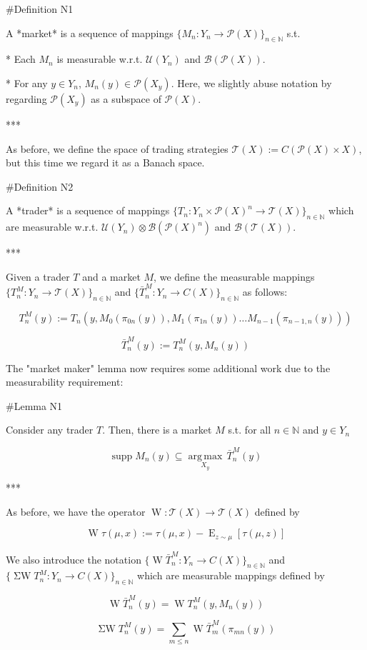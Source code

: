 \documentclass[a4paper]{article}
\DeclareMathOperator{\Supp}{supp}
\DeclareMathOperator{\E}{E}
\newcommand{\Argmax}[1]{\underset{#1}{\operatorname{arg\,max}}\,}
\newcommand{\Nats}{\mathbb{N}}
\newcommand{\Prob}{\mathcal{P}}
\newcommand{\T}{\mathcal{T}}
\newcommand{\B}{\mathcal{B}}
\newcommand{\UM}{\mathcal{U}}
\newcommand{\W}{\operatorname{W}}
\newcommand{\SW}{\operatorname{\Sigma W}}
\begin{document}
\#Definition N1

A *market* is a sequence of mappings ${\{M_n: Y_n \rightarrow \Prob(X)\}}_{n \in \Nats}$ s.t.

* Each ${M_n}$ is measurable w.r.t. ${\UM(Y_n)}$ and ${\B(\Prob(X))}$.

* For any ${y \in Y_n}$, ${M_n(y) \in \Prob(X_y)}$. Here, we slightly abuse notation by regarding ${\Prob(X_y)}$ as a subspace of ${\Prob(X)}$.

***

As before, we define the space of trading strategies ${\T(X):=C(\Prob(X)\times X)}$, but this time we regard it as a Banach space. 

\#Definition N2

A *trader* is a sequence of mappings ${\{T_n: Y_n \times \Prob(X)^n \rightarrow \T(X)\}}_{n \in \Nats}$ which are measurable w.r.t. ${\UM(Y_n) \otimes \B(\Prob(X)^n)}$ and ${\B(\T(X))}$.

***

Given a trader ${T}$ and a market ${M}$, we define the measurable mappings ${\{T^M_n: Y_n \rightarrow \T(X)\}_{n \in \Nats}}$ and ${\{\bar{T}^M_n: Y_n \rightarrow C(X)\}_{n \in \Nats}}$ as follows:

$$T^M_n(y):= T_n(y, M_0(\pi_{0n}(y)),M_1(\pi_{1n}(y)) \ldots M_{n-1}(\pi_{n-1,n}(y)))$$

$$\bar{T}^M_n(y):= T^M_n(y,M_n(y))$$

The "market maker" lemma now requires some additional work due to the measurability requirement:

\#Lemma N1

Consider any trader ${T}$. Then, there is a market ${M}$ s.t. for all ${n \in \Nats}$ and ${y \in Y_n}$

$$\Supp M_n(y) \subseteq \Argmax{X_y} \bar{T}^M_n(y)$$

***

As before, we have the operator ${\W: \T(X) \rightarrow \T(X)}$ defined by 

$$\W \tau(\mu,x):= \tau(\mu,x) - \E_{z \sim \mu}[\tau(\mu,z)]$$

We also introduce the notation ${\{\W \bar{T}^M_n: Y_n \rightarrow C(X)\}_{n \in \Nats}}$ and ${\{\SW T^M_n: Y_n \rightarrow C(X)\}_{n \in \Nats}}$ which are measurable mappings defined by

$$\W \bar{T}^M_n(y) = \W T^M_n(y, M_n(y))$$

$$\SW T^M_n(y) = \sum_{m \leq n} \W \bar{T}^M_m(\pi_{mn}(y))$$
\end{document}
